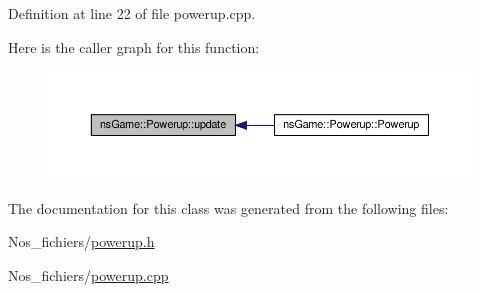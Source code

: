 Definition at line 22 of file powerup.\+cpp.

Here is the caller graph for this function\+:\nopagebreak
\begin{figure}[H]
\begin{center}
\leavevmode
\includegraphics[width=350pt]{classns_game_1_1_powerup_a0f86905ba37cc0a4e80827db0563cfa3_icgraph}
\end{center}
\end{figure}


The documentation for this class was generated from the following files\+:\begin{DoxyCompactItemize}
\item 
Nos\+\_\+fichiers/\hyperlink{powerup_8h}{powerup.\+h}\item 
Nos\+\_\+fichiers/\hyperlink{powerup_8cpp}{powerup.\+cpp}\end{DoxyCompactItemize}
